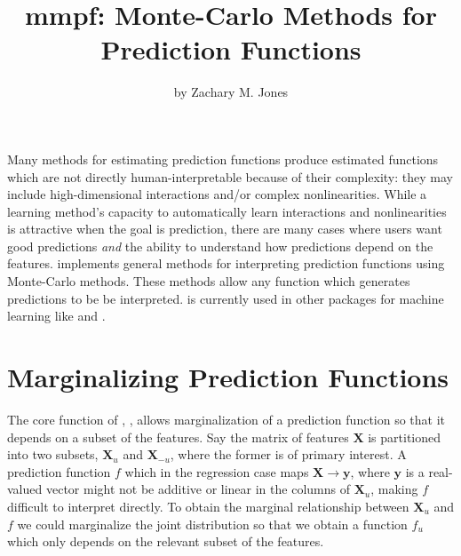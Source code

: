 \title{mmpf: Monte-Carlo Methods for Prediction Functions}
\author{by Zachary M. Jones}

\maketitle


Many methods for estimating prediction functions produce estimated functions which are not directly human-interpretable because of their complexity: they may include high-dimensional interactions and/or complex nonlinearities. While a learning method's capacity to automatically learn interactions and nonlinearities is attractive when the goal is prediction, there are many cases where users want good predictions \textit{and} the ability to understand how predictions depend on the features.  implements general methods for interpreting prediction functions using Monte-Carlo methods. These methods allow any function which generates predictions to be be interpreted.  is currently used in other packages for machine learning like  and  \citep{jones2016,JMLR:v17:15-066}.

\section{Marginalizing Prediction Functions}

The core function of , , allows marginalization of a prediction function so that it depends on a subset of the features. Say the matrix of features $\mathbf{X}$ is partitioned into two subsets, $\mathbf{X}_u$ and $\mathbf{X}_{-u}$, where the former is of primary interest. A prediction function $f$ which in the regression case maps $\mathbf{X} \rightarrow \mathbf{y}$, where $\mathbf{y}$ is a real-valued vector might not be additive or linear in the columns of $\mathbf{X}_u$, making $f$ difficult to interpret directly. To obtain the marginal relationship between $\mathbf{X}_u$ and $f$ we could marginalize the joint distribution so that we obtain a function $f_u$ which only depends on the relevant subset of the features.

